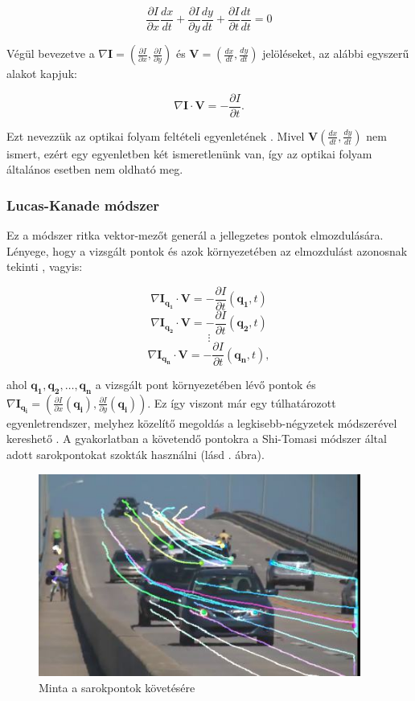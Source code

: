 \[\frac{\partial I}{\partial x} \frac{dx}{dt} + \frac{\partial I}{\partial y} \frac{dy}{dt} + \frac{\partial I}{\partial t} \frac{dt}{dt} = 0\]

Végül bevezetve a $\nabla \mathbf{I} = \left(\frac{\partial I}{\partial x}, \frac{\partial I}{\partial y}\right)$ és $\mathbf{V} = \left(\frac{dx}{dt}, \frac{dy}{dt}\right)$ jelöléseket, az alábbi egyszerű alakot kapjuk:

\[\nabla \mathbf{I} \cdot \mathbf{V} = -\frac{\partial I}{\partial t}.\]

Ezt nevezzük az optikai folyam feltételi egyenletének \cite{phd}. Mivel $\mathbf{V}\left(\frac{dx}{dt}, \frac{dy}{dt}\right)$ nem ismert, ezért egy egyenletben két ismeretlenünk van, így az optikai folyam általános esetben nem oldható meg.

\subsubsection{Lucas-Kanade módszer \cite{LK}}

Ez a módszer ritka vektor-mezőt generál a jellegzetes pontok elmozdulására. Lényege, hogy a vizsgált pontok és azok környezetében az elmozdulást azonosnak tekinti \cite{lk-wiki}, vagyis:

\[\nabla \mathbf{I}_{\mathbf{q_1}} \cdot \mathbf{V} = -\frac{\partial I}{\partial t}(\mathbf{q_1}, t)\]
\[\nabla \mathbf{I}_{\mathbf{q_2}} \cdot \mathbf{V} = -\frac{\partial I}{\partial t}(\mathbf{q_2}, t)\]
\[\vdots\]
\[\nabla \mathbf{I}_{\mathbf{q_n}} \cdot \mathbf{V} = -\frac{\partial I}{\partial t}(\mathbf{q_n}, t),\]

ahol $\mathbf{q_1},\mathbf{q_2},\ldots,\mathbf{q_n}$ a vizsgált pont környezetében lévő pontok és $\nabla \mathbf{I}_{\mathbf{q_i}} = \left(\frac{\partial I}{\partial x}(\mathbf{q_i}), \frac{\partial I}{\partial y}(\mathbf{q_i})\right)$. Ez így viszont már egy túlhatározott egyenletrendszer, melyhez közelítő megoldás a legkisebb-négyzetek módszerével kereshető \cite{LK, lk-wiki}. A gyakorlatban a követendő pontokra a Shi-Tomasi módszer \cite{shi-thomasi} által adott sarokpontokat szokták használni (lásd . ábra).

\begin{figure}[tbh]
\centering
\includegraphics[width=300pt]{figures/opticalflow_lk.jpg}
\caption{Minta a sarokpontok követésére \cite{opencv-lk} \label{fig:lk}}
\end{figure}

